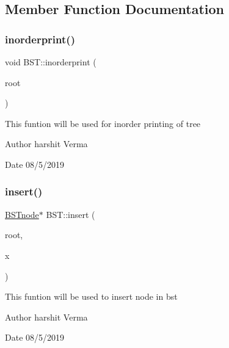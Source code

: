 \subsection{Member Function Documentation}
\mbox{\label{classBST_ada5620d8d4fd050273055ecea1d6f03b}} 
\subsubsection{\texorpdfstring{inorderprint()}{inorderprint()}}
{\footnotesize\ttfamily void B\+S\+T\+::inorderprint (\begin{DoxyParamCaption}\item[{\hyperlink{classBSTnode}{B\+S\+Tnode} $\ast$}]{root }\end{DoxyParamCaption})\hspace{0.3cm}{\ttfamily [inline]}}

This funtion will be used for inorder printing of tree \begin{DoxyAuthor}{Author}
harshit Verma 
\end{DoxyAuthor}
\begin{DoxyDate}{Date}
08/5/2019 
\end{DoxyDate}
\mbox{\label{classBST_af65e88788cd21ab5e64e645cbe541c8c}} 
\subsubsection{\texorpdfstring{insert()}{insert()}}
{\footnotesize\ttfamily \hyperlink{classBSTnode}{B\+S\+Tnode}$\ast$ B\+S\+T\+::insert (\begin{DoxyParamCaption}\item[{\hyperlink{classBSTnode}{B\+S\+Tnode} $\ast$}]{root,  }\item[{int}]{x }\end{DoxyParamCaption})\hspace{0.3cm}{\ttfamily [inline]}}

This funtion will be used to insert node in bst \begin{DoxyAuthor}{Author}
harshit Verma 
\end{DoxyAuthor}
\begin{DoxyDate}{Date}
08/5/2019 
\end{DoxyDate}
\mbox{\label{classBST_a416d136d85763c420f35f5f3dcdb72db}} 
